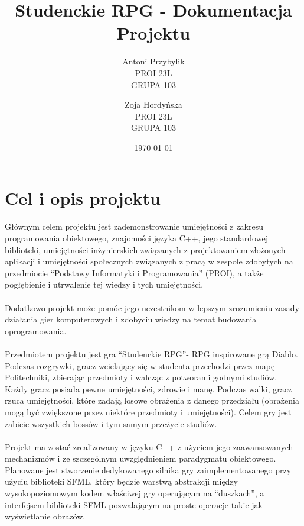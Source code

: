 \documentclass[12pt, titlepage]{article}
\author{Antoni Przybylik \\ PROI 23L \\ GRUPA 103 \and
	Zoja Hordyńska \\ PROI 23L \\ GRUPA 103}
\date{\today}
\title{Studenckie RPG - Dokumentacja Projektu}
\begin{document}
\maketitle
\justifying



\hypersetup{
	colorlinks=true,
	linkcolor=blue,
}

\lstset{style=listingstyle}

\section{Cel i opis projektu}
Głównym celem projektu jest zademonstrowanie
umiejętności z zakresu programowania
obiektowego, znajomości języka C++,
jego standardowej biblioteki, umiejętności
inżynierskich związanych z projektowaniem
złożonych aplikacji i umiejętności społecznych
związanych z pracą w zespole zdobytych na
przedmiocie "`Podstawy Informatyki i Programowania"'
(PROI), a także pogłębienie i utrwalenie
tej wiedzy i tych umiejętności. 
\\~\\
Dodatkowo projekt może pomóc jego uczestnikom w
lepszym zrozumieniu zasady działania gier
komputerowych i zdobyciu wiedzy na temat budowania
oprogramowania.
\\~\\
Przedmiotem projektu jest gra "`Studenckie RPG"'- RPG
inspirowane grą Diablo. Podczas rozgrywki, gracz
wcielający się w studenta przechodzi
przez mapę Politechniki, zbierając przedmioty i
walcząc z potworami godnymi studiów. Każdy gracz
posiada pewne umiejętności, zdrowie i manę.
Podczas walki, gracz rzuca umiejętności, które
zadają losowe obrażenia z danego przedziału
(obrażenia mogą być zwiększone przez niektóre
przedmioty i umiejętności). Celem gry jest zabicie
wszystkich bossów i tym samym przeżycie studiów.
\\~\\
Projekt ma zostać zrealizowany w języku C++ z użyciem
jego zaawansowanych mechanizmów i ze szczególnym
uwzględnieniem paradygmatu obiektowego. Planowane
jest stworzenie dedykowanego silnika gry
zaimplementowanego przy użyciu biblioteki SFML, który
będzie warstwą abstrakcji między wysokopoziomowym
kodem właściwej gry operującym na "`duszkach"', a
interfejsem biblioteki SFML pozwalającym na
proste operacje takie jak wyświetlanie obrazów.
\end{document}
